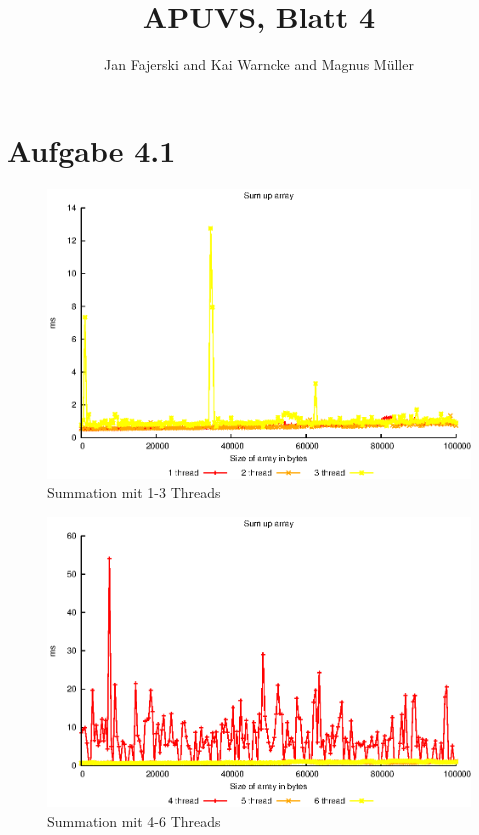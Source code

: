 \documentclass[a4paper,
12pt,
BCOR12mm,
]{scrartcl}
\title{APUVS, Blatt 4}
\author{Jan Fajerski and Kai Warncke and Magnus Müller}
\begin{document}

\maketitle 

\section*{Aufgabe 4.1}

\begin{figure}[!h]
	\begin{center}
		\includegraphics[width=\textwidth]{../a_4_1/graphs/summation_1st}
	\end{center}
	\caption{Summation mit 1-3 Threads}
	\label{fig:summation_1_3}
\end{figure}
\begin{figure}[!h]
	\begin{center}
		\includegraphics[width=\textwidth]{../a_4_1/graphs/summation_2nd}
	\end{center}
	\caption{Summation mit 4-6 Threads}
	\label{fig:summation_4_6}
\end{figure}
\end{document}
